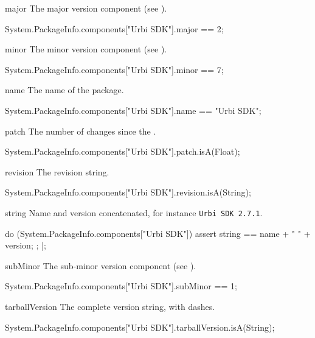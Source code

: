 \begin{urbiscriptapi}
\item[major] The major version component (see ).
\begin{urbiassert}
System.PackageInfo.components["Urbi SDK"].major
  == 2;
\end{urbiassert}

\item[minor] The minor version component (see ).
\begin{urbiassert}
System.PackageInfo.components["Urbi SDK"].minor
  == 7;
\end{urbiassert}

\item[name] The name of the package.
\begin{urbiassert}
System.PackageInfo.components["Urbi SDK"].name
  == "Urbi SDK";
\end{urbiassert}

\item[patch] The number of changes since the .
\begin{urbiassert}
System.PackageInfo.components["Urbi SDK"].patch.isA(Float);
\end{urbiassert}

\item[revision] The revision string.
\begin{urbiassert}
System.PackageInfo.components["Urbi SDK"].revision.isA(String);
\end{urbiassert}

\item[string] Name and version concatenated, for instance
  \lstinline|Urbi SDK 2.7.1|.
\begin{urbiscript}
do (System.PackageInfo.components["Urbi SDK"])
{
  assert
  {
    string == name + " " + version;
  };
}|;
\end{urbiscript}

\item[subMinor] The sub-minor version component (see ).
\begin{urbiassert}
System.PackageInfo.components["Urbi SDK"].subMinor
  == 1;
\end{urbiassert}

\item[tarballVersion] The complete version string, with dashes.
\begin{urbiassert}
System.PackageInfo.components["Urbi SDK"].tarballVersion.isA(String);
\end{urbiassert}


\end{urbiscriptapi}
